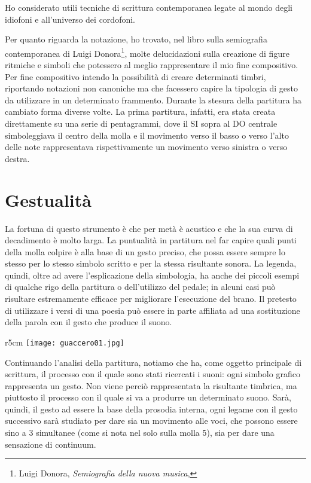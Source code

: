 Ho considerato utili tecniche di scrittura contemporanea legate al mondo degli idiofoni e all'universo dei cordofoni.

Per quanto riguarda la notazione, ho trovato, nel libro sulla semiografia contemporanea di Luigi Donora\footnote{Luigi Donora, \textit{Semiografia della nuova musica}, }, molte delucidazioni sulla creazione di figure ritmiche e simboli che potessero al meglio rappresentare il mio fine compositivo. Per fine compositivo intendo la possibilità di creare determinati timbri, riportando notazioni non canoniche ma che facessero capire la tipologia di gesto da utilizzare in un determinato frammento. Durante la stesura della partitura ha cambiato forma diverse volte. La prima partitura, infatti, era stata creata direttamente su una serie di pentagrammi, dove il SI sopra al DO centrale  simboleggiava il centro della molla e il movimento verso il basso o verso l'alto delle note rappresentava rispettivamente un movimento verso sinistra o verso destra.


\section{Gestualità}

La fortuna di questo strumento è che per metà è acustico e che la sua curva di decadimento è molto larga. La puntualità in partitura nel far capire quali punti della molla colpire è alla base di un gesto preciso, che possa essere sempre lo stesso per lo stesso simbolo scritto e per la stessa risultante sonora. La legenda, quindi, oltre ad avere l'esplicazione della simbologia, ha anche dei piccoli esempi di qualche rigo della partitura o dell'utilizzo del pedale; in alcuni casi può risultare estremamente efficace per migliorare l'esecuzione del brano. Il pretesto di utilizzare i versi di una poesia può essere in parte affiliata ad una sostituzione della parola con il gesto che produce il suono. 

\begin{wrapfigure}{r}{5cm}
\centering
\texttt{[image: guaccero01.jpg]}
\caption{\textit{Particolare di Sinfonia 1 di Domenico Guaccero}}
\label{fig:guacc}
\end{wrapfigure}

Continuando l'analisi della partitura, notiamo che ha, come oggetto principale di scrittura, il processo con il quale sono stati ricercati i suoni: ogni simbolo grafico rappresenta un gesto. Non viene perciò rappresentata la risultante timbrica, ma piuttosto il processo con il quale si va a produrre un determinato suono. Sarà, quindi, il gesto ad essere la base della prosodia interna, ogni legame con il gesto successivo sarà studiato per dare sia un movimento alle voci, che possono essere sino a 3 simultanee (come si nota nel solo sulla molla 5), sia per dare una sensazione di continuum.

